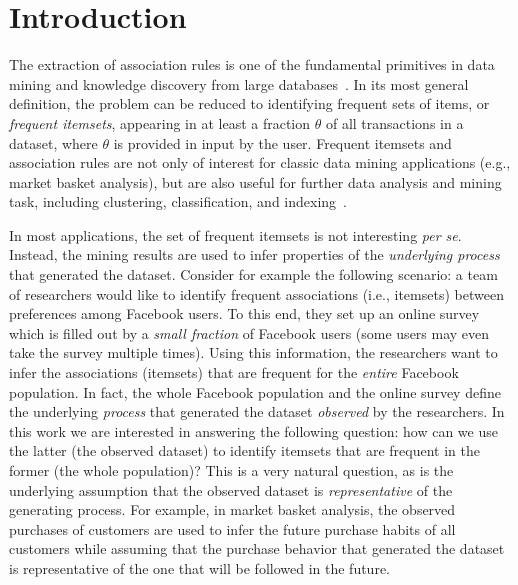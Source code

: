 \section{Introduction}\label{sec:intro}

The extraction of association rules is one of the fundamental primitives in
data mining and knowledge discovery from large databases~\citep{AgrawalIS93}.
In its most general definition, the problem can be reduced to identifying
frequent sets of items, or \emph{frequent itemsets}, appearing in at
least a fraction  $\theta$ of all transactions in a dataset, where $\theta$ is provided in
input by the user. Frequent itemsets and association rules are not only of
interest for classic data mining applications (e.g., market basket analysis), but
are also useful for further data analysis and mining task, including clustering,
classification, and indexing~\citep{han2006data,HanCXY07}.

In most applications, the set of frequent itemsets is not interesting \emph{per
se}. Instead, the mining results 
are used to infer properties of the \emph{underlying process} that generated the
dataset. Consider for example the following scenario: a team of researchers would like 
to identify frequent associations (i.e., itemsets) between preferences among
Facebook users. To this end, they set up an online survey 
which is filled out by a \emph{small fraction} of Facebook users (some users may even
take the survey multiple times). Using this information, the researchers want to
infer the associations (itemsets) that are frequent for the \emph{entire} Facebook
population. In fact, the whole Facebook population and the online survey define
the underlying \emph{process} that
generated the dataset \emph{observed} by the researchers. In this work we are
interested in answering the following question: how can we use the latter (the
observed dataset) to identify itemsets that are
frequent in the former (the whole population)? This is a very natural question,
as is the underlying assumption that the
observed dataset is \emph{representative} of the generating process. For
example, in market basket analysis, the observed purchases of customers are used to infer the future
purchase habits of all customers while assuming that the purchase behavior that
generated the dataset is representative of the one that will be followed in the future.

